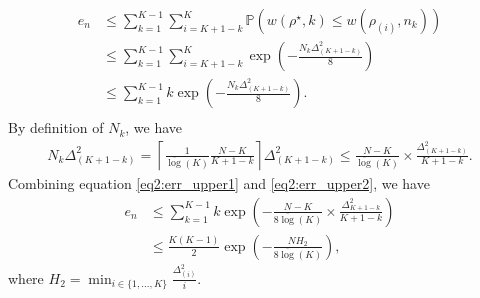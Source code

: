     \begin{equation} \label{eq2:err_upper1}
        \begin{aligned} 
            e_n & \leq \sum_{k=1}^{K-1}\sum_{i = K+1-k}^K \mathbb{P}(w({\rho^\star,k}) \leq w({\rho_{(i)},n_k})) \\
            & \leq \sum_{k=1}^{K-1}\sum_{i = K+1-k}^K \exp\left( - \frac{N_k \Delta^2_{(K+1-k)}}{8}\right) \\
            &  \leq \sum_{k=1}^{K-1} k \exp\left( - \frac{N_k \Delta^2_{(K+1-k)}}{8}\right). \\
        \end{aligned}
    \end{equation}
    By definition of $N_k$, we have
    \begin{equation} \label{eq2:err_upper2}
        \begin{aligned}
             N_k \Delta^2_{(K+1-k)} 
            =  \left\lceil \frac{1}{\overline{\log}(K)} \frac{N-K}{K+1-k}\right\rceil\Delta^2_{(K+1-k)} 
            \leq  \frac{N-K}{\overline{\log}(K)} \times \frac{\Delta^2_{(K+1-k)}}{K+1-k}. 
        \end{aligned}
    \end{equation}
    Combining equation \eqref{eq2:err_upper1} and \eqref{eq2:err_upper2}, we have
    \begin{equation*}
        \begin{aligned}
            e_n & \leq \sum_{k=1}^{K-1} k \exp\left( - \frac{N-K}{8\overline{\log}(K)} \times \frac{\Delta^2_{K+1-k}}{K+1-k}\right) \\
            & \leq \frac{K(K-1)}{2} \exp\left(-\frac{NH_2}{8\overline{\log}(K)}\right),
        \end{aligned}
    \end{equation*}
    where $H_2 = \min_{i \in \{1,...,K\}} \frac{\Delta^2_{(i)}}{i}$.